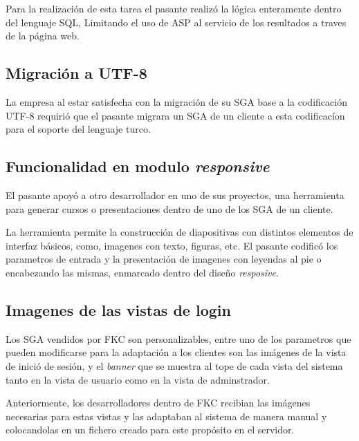 	Para la realización de esta tarea el pasante realizó la lógica enteramente dentro del lenguaje SQL, Limitando el uso de ASP al servicio de los resultados a traves de la página web.


	\subsection{Migración a UTF-8} %
	\label{sub:migración_a_utf_8}
	
	La empresa al estar satisfecha con la migración de su SGA base a la codificación UTF-8 requirió que el pasante migrara un SGA de un cliente a esta codificacíon para el soporte del lenguaje turco.

	\subsection{Funcionalidad en modulo \emph{responsive}} %
	\label{sub:funcionalidad_en_modulo_responsive}
	
	El pasante apoyó a otro desarrollador en uno de sus proyectos, una herramienta para generar cursos o presentaciones dentro de uno de los SGA de un cliente.

	La herramienta permite la construcción de diapositivas con distintos elementos de interfaz básicos, como, imagenes con texto, figuras, etc. El pasante codificó los parametros de entrada y la presentación de imagenes con leyendas al pie o encabezando las mismas, enmarcado dentro del diseño \emph{resposive}.


	\subsection{Imagenes de las vistas de login} %
	\label{sub:imagenes_de_las_vistas_de_login}
	
	Los SGA vendidos por FKC son personalizables, entre uno de los parametros que pueden modificarse para la adaptación a los clientes son las imágenes de la vista de inició de sesión, y el \emph{banner} que se muestra al tope de cada vista del sistema tanto en la vista de usuario como en la vista de adminstrador.

	Anteriormente, los desarrolladores dentro de FKC recibian las imágenes necesarias para estas vistas y las adaptaban al sistema de manera manual y colocandolas en un fichero creado para este propósito en el servidor.

